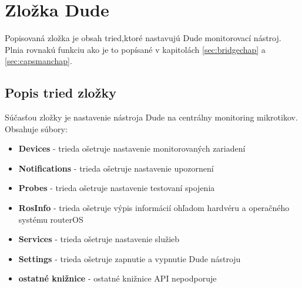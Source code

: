 \section{Zložka Dude}
Popisovaná zložka je obsah tried,ktoré nastavujú Dude monitorovací nástroj. Plnia rovnakú funkciu ako je to popísané v kapitolách \ref{sec:bridgechap} a \ref{sec:capsmanchap}. 
\subsection{Popis tried zložky}
Súčasťou zložky je nastavenie nástroja Dude na centrálny monitoring mikrotikov. Obsahuje súbory:\begin{itemize}
\item \textbf{Devices} - trieda ošetruje nastavenie monitorovaných zariadení
\item \textbf{Notifications} - trieda ošetruje nastavenie upozornení
\item \textbf{Probes} - trieda ošetruje nastavenie testovaní spojenia
\item \textbf{RosInfo} - trieda ošetruje výpis informácií ohľadom hardvéru a operačného systému routerOS
\item \textbf{Services} - trieda ošetruje nastavenie služieb
\item \textbf{Settings} - trieda ošetruje zapnutie a vypnutie Dude nástroju
\item \textbf{ostatné knižnice} - ostatné knižnice API nepodporuje
\end{itemize}
